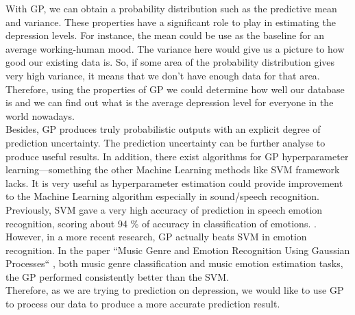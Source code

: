 \documentclass{article}
\begin{document}
	With GP, we can obtain a probability distribution such as the predictive mean and variance. 
	These properties have a signiﬁcant role to play in estimating the depression levels. For instance, 
	the mean could be use as the baseline for an average working-human mood. The variance here would give us a picture to how good our existing data is. 
	So, if some area of the probability distribution gives very high variance, it means that we don’t have enough data for that area. 
	Therefore, using the properties of GP we could determine how well our database is and we can find out what is the average depression level for 
	everyone in the world nowadays. \\

	Besides, GP produces truly probabilistic outputs with an explicit degree of prediction uncertainty. 
	The prediction uncertainty can be further analyse to produce useful results. In addition, there exist algorithms for GP hyperparameter 
	learning—something the other Machine Learning methods like SVM framework lacks. It is very useful as hyperparameter estimation could provide 
	improvement to the Machine Learning algorithm especially in sound/speech recognition. \cite{Hashimoto2015} \\

	Previously,  SVM gave a very high accuracy of prediction in speech emotion recognition, scoring about 94 \% 
	of accuracy in classification of emotions. \cite{Chavhan2010}. However, in a more recent research, GP actually beats SVM in emotion recognition. 
	In the paper  “Music Genre and Emotion Recognition Using Gaussian Processes“ \cite{MARKOV2013}, 
	both music genre classification and music emotion estimation tasks, the GP performed consistently better than the SVM. \\

	Therefore, as we are trying to prediction on depression, we would like to use GP to process our data to produce a more accurate prediction result. 


	
\end{document}
